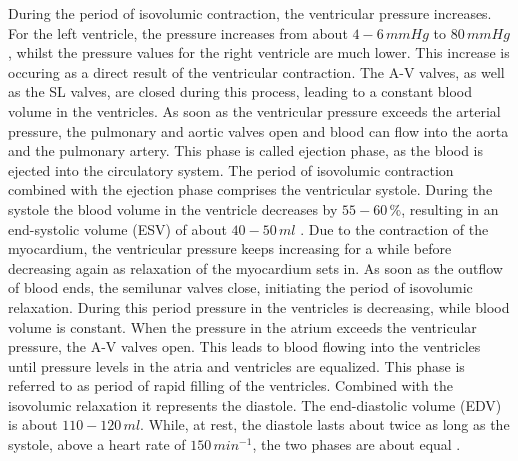 During the period of isovolumic contraction, the ventricular pressure increases. For the left ventricle, the pressure increases from about $4-6 \, mmHg$ to $80 \, mmHg$, whilst the pressure values for the right ventricle are much lower. This increase is occuring as a direct result of the ventricular contraction. The A-V valves, as well as the SL valves, are closed during this process, leading to a constant blood volume in the ventricles. As soon as the ventricular pressure exceeds the arterial pressure, the pulmonary and aortic valves open and blood can flow into the aorta and the pulmonary artery. This phase is called ejection phase, as the blood is ejected into the circulatory system. The period of isovolumic contraction combined with the ejection phase comprises the ventricular systole. \cite{HKS4} During the systole the blood volume in the ventricle decreases by $55-60 \, \%$, resulting in an end-systolic volume (ESV) of about $40-50 \, ml$ \cite{GH20}. Due to the contraction of the myocardium, the ventricular pressure keeps increasing for a while before decreasing again as relaxation of the myocardium sets in. As soon as the outflow of blood ends, the semilunar valves close, initiating the period of isovolumic relaxation. During this period pressure in the ventricles is decreasing, while blood volume is constant. When the pressure in the atrium exceeds the ventricular pressure, the A-V valves open. This leads to blood flowing into the ventricles until pressure levels in the atria and ventricles are equalized. \cite{HKS4} This phase is referred to as period of rapid filling of the ventricles. Combined with the isovolumic relaxation it represents the diastole. The end-diastolic volume (EDV) is about $110-120 \, ml$. \cite{GH20} While, at rest, the diastole lasts about twice as long as the systole, above a heart rate of $150 \, min^{-1}$, the two phases are about equal \cite{HKS4}.

